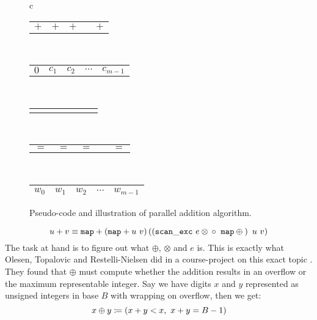 \begin{figure}
\begin{minipage}{0.45\textwidth}
\begin{tabular}{c}
\begin{tabular}{C{0.7cm}C{0.7cm}C{0.7cm}C{0.7cm}C{0.7cm}}
        $+$ & $+$ & $+$ &  & $+$\\
      \end{tabular}\\
      \begin{tabular}{C{0.7cm}C{0.7cm}C{0.7cm}C{0.7cm}C{0.7cm}}
        $0$ & $c_1$ &  $c_2$ & $\cdots$ &$c_{m-1}$ \\
      \end{tabular}\\[-0.8ex]
      \begin{tabular}{C{0.15cm}C{0.15cm}C{0.15cm}C{0.15cm}C{0.15cm}C{0.15cm}C{0.15cm}}
       \diagonalarrow{} & & \diagonalarrow{} &  & \diagonalarrow{} &  & \diagonalarrow{}\\
      \end{tabular}\\[-2ex]
      \begin{tabular}{C{0.7cm}C{0.7cm}C{0.8cm}C{0.7cm}C{0.7cm}}
        $=$ & $=$ & $=$ &  & $=$  
      \end{tabular}\\
      \begin{tabular}{|C{0.7cm}|C{0.7cm}|C{0.7cm}|C{0.7cm}|C{0.7cm}|}
        \hline
        $w_{0}$ & $w_1$ & $w_2$ & $\cdots$ & $w_{m-1}$\\
        \hline
      \end{tabular}
    \end{tabular}
  \end{minipage}
  \caption{Pseudo-code and illustration of parallel addition algorithm.}
  \label{fig:addpar}
\end{figure}


\begin{equation}
\label{eq:addgpu}
u + v \equiv \mathtt{map} + \left( \mathtt{map} + u~v\right) \left(\left({\mathtt{scan\_exc}~e \otimes \phantom{}} \circ~\mathtt{map} \oplus \phantom{}\right)~u~v\right)
\end{equation}
The task at hand is to figure out what $\oplus$, $\otimes$ and $e$ is. This is exactly what
Olesen, Topalovic and Restelli-Nielsen did in a course-project on this exact
topic \cite{DPP-PROJECT}. They found that $\oplus$ must compute whether the addition
results in an overflow or the maximum representable integer. Say we have digits
$x$ and $y$ represented as unsigned integers in base $B$ with wrapping on
overflow, then we get:
\begin{equation}
\label{eq:oplus}
x \oplus y \coloneq (x + y < x,~x + y = B-1)
\end{equation}

